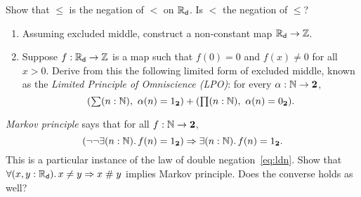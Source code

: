 \begin{ex}
  Show that $\leq$ is the negation of $<$ on $\mathbb{R}_\mathsf{d}$. Is $<$ the negation of $\leq$?
\end{ex}

\begin{ex} \label{ex:reals-non-constant-into-Z}
  \mbox{}
  \begin{enumerate}
  \item Assuming excluded middle, construct a non-constant map $\mathbb{R}_\mathsf{d} \to \mathbb{Z}$.
  \item Suppose $f : \mathbb{R}_\mathsf{d} \to \mathbb{Z}$ is a map such that $f(0) = 0$ and $f(x) \neq 0$ for all
    $x > 0$. Derive from this the following limited form of excluded middle, known as the
    \emph{Limited Principle of Omniscience (LPO)}: for every $\alpha : \mathbb{N} \to \mathbf{2}$,
    \begin{equation*}
      (\sm{n : \N} \alpha(n) = \btrue) + (\prd{n : \N} \alpha(n) = \bfalse).
    \end{equation*}
  \end{enumerate}
\end{ex}

\begin{ex} \label{ex:reals-apart-neq-MP}
  \emph{Markov principle} says that for all $f : \mathbb{N} \to \mathbf{2}$,
  \begin{equation*}
    (\lnot \lnot \exis{n : \nat} f(n) = \btrue)
    \Rightarrow
    \exis{n : \nat} f(n) = \btrue.
  \end{equation*}
  This is a particular instance of the law of double negation~\eqref{eq:ldn}. Show that
  $\fall{x, y: \RD} x \neq y \Rightarrow x \apart y$ implies Markov principle. Does the
  converse holds as well?
\end{ex}

